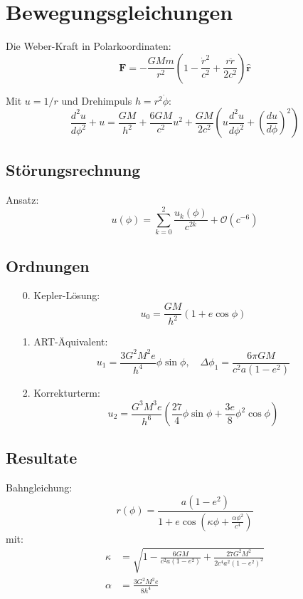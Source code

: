 \newpage
\section{Bewegungsgleichungen}
Die Weber-Kraft in Polarkoordinaten:
\begin{equation}
\mathbf{F} = -\frac{GMm}{r^2}\left(1 - \frac{\dot{r}^2}{c^2} + \frac{r\ddot{r}}{2c^2}\right)\mathbf{\hat{r}}
\end{equation}

Mit $u=1/r$ und Drehimpuls $h=r^2\dot{\phi}$:
\begin{equation}
\frac{d^2u}{d\phi^2} + u = \frac{GM}{h^2} + \frac{6GM}{c^2}u^2 + \frac{GM}{2c^2}\left(u\frac{d^2u}{d\phi^2} + \left(\frac{du}{d\phi}\right)^2\right)
\end{equation}

\subsection{Störungsrechnung}
Ansatz:
\begin{equation}
u(\phi) = \sum_{k=0}^2 \frac{u_k(\phi)}{c^{2k}} + \mathcal{O}(c^{-6})
\end{equation}

\subsection{Ordnungen}
\begin{itemize}
\item[0.] Kepler-Lösung:
\begin{equation}
u_0 = \frac{GM}{h^2}(1 + e\cos\phi)
\end{equation}

\item[1.] ART-Äquivalent:
\begin{equation}
u_1 = \frac{3G^2M^2e}{h^4}\phi\sin\phi,\quad \Delta\phi_1 = \frac{6\pi GM}{c^2a(1-e^2)}
\end{equation}

\item[2.] Korrekturterm:
\begin{equation}
u_2 = \frac{G^3M^3e}{h^6}\left(\frac{27}{4}\phi\sin\phi + \frac{3e}{8}\phi^2\cos\phi\right)
\end{equation}
\end{itemize}

\subsection{Resultate}
Bahngleichung:
\begin{equation}
\boxed
{
    r(\phi) = \frac{a(1-e^2)}{1 + e\cos\left(\kappa\phi + \frac{\alpha\phi^2}{c^4}\right)}
}
\end{equation}
mit:
\begin{align}
\kappa &= \sqrt{1 - \frac{6GM}{c^2a(1-e^2)} + \frac{27G^2M^2}{2c^4a^2(1-e^2)^2}}\\
\alpha &= \frac{3G^2M^2e}{8h^4}
\end{align}

